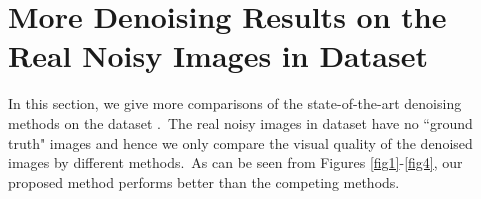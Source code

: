 \documentclass[10pt,onecolumn,letterpaper]{article}
\begin{document}

\section{More Denoising Results on the Real Noisy Images in Dataset \cite{ncwebsite}}
In this section, we give more comparisons of the state-of-the-art denoising methods on the dataset \cite{ncwebsite}.\ The real noisy images in dataset \cite{ncwebsite} have no ``ground truth" images and hence we only compare the visual quality of the denoised images by different methods.\ As can be seen from Figures \ref{fig1}-\ref{fig4}, our proposed method performs better than the competing methods.
\end{document}
